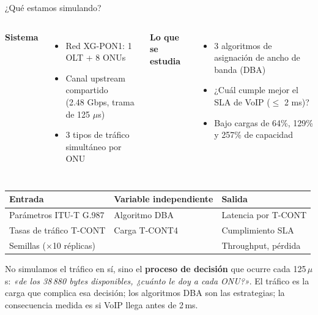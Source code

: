 \documentclass[aspectratio=169,t]{beamer}
\begin{document}
\begin{frame}{¿Qué estamos simulando?}
    \begin{columns}[t]
        \textbf{Sistema}
        \begin{itemize}
            \item Red XG-PON1: 1 OLT + 8 ONUs
            \item Canal upstream compartido\\(2.48 Gbps, trama de 125 $\mu$s)
            \item 3 tipos de tráfico simultáneo por ONU
        \end{itemize}
        \textbf{Lo que se estudia}
        \begin{itemize}
            \item 3 algoritmos de asignación de ancho de banda (DBA)
            \item ¿Cuál cumple mejor el SLA de VoIP ($\leq$ 2 ms)?
            \item Bajo cargas de 64\%, 129\% y 257\% de capacidad
        \end{itemize}
    \end{columns}
    \vspace{0.35cm}
    \begin{center}
    \footnotesize
    \begin{tabular}{lll}
        \toprule
        Entrada & Variable independiente & Salida \\
        \midrule
        Parámetros ITU-T G.987 & Algoritmo DBA & Latencia por T-CONT \\
        Tasas de tráfico T-CONT & Carga T-CONT4 & Cumplimiento SLA \\
        Semillas ($\times$10 réplicas) & & Throughput, pérdida \\
        \bottomrule
    \end{tabular}
    \end{center}
    \vspace{0.15cm}
    \begin{block}{}
    \small No simulamos el tráfico en sí, sino el \textbf{proceso de decisión} que ocurre cada 125\,$\mu$s: \emph{«de los 38\,880 bytes disponibles, ¿cuánto le doy a cada ONU?»}. El tráfico es la carga que complica esa decisión; los algoritmos DBA son las estrategias; la consecuencia medida es si VoIP llega antes de 2\,ms.
    \end{block}
\end{frame}
\end{document}
